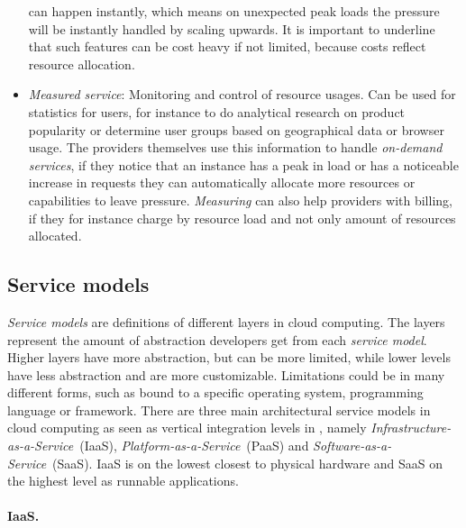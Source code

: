 \begin{itemize}
    can happen instantly, which means on unexpected peak loads the pressure will be
    instantly handled by scaling upwards.
    It is important to underline that such features can be cost heavy if not limited,
    because costs reflect resource allocation.
  \item \emph{Measured service}: Monitoring and control of resource usages.
    Can be used for statistics for users, for instance to do analytical research on product popularity
    or determine user groups based on geographical data or browser usage.
    The providers themselves use this information to handle \emph{on-demand services},
    if they notice that an instance has a peak in load or has a noticeable increase 
    in requests they can automatically allocate more resources or capabilities 
    to leave pressure.
    \emph{Measuring} can also help providers with billing, if they for instance
    charge by resource load and not only amount of resources allocated.
\end{itemize}

\subsection{Service models}

\emph{Service models} are definitions of different layers in cloud computing.
The layers represent the amount of abstraction developers get from each \emph{service model}.
Higher layers have more abstraction, but can be more limited, while lower levels 
have less abstraction and are more customizable.
Limitations could be in many different forms, such as bound to a specific operating system,
programming language or framework.
There are three main architectural service models in cloud computing\cite{nist:mell11}
as seen as vertical integration levels in ,
namely \emph{Infrastructure-as-a-Service}~(IaaS), \emph{Platform-as-a-Service}~(PaaS)
and \emph{Software-as-a-Service}~(SaaS).
IaaS is on the lowest closest to physical hardware and SaaS on the highest
level as runnable applications.

\paragraph{IaaS.}

